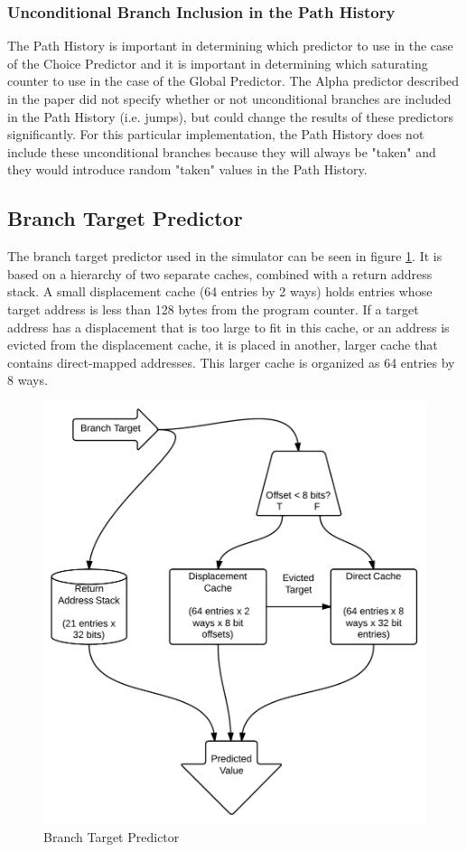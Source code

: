 \documentclass[twocolumn]{article}
\newcommand{\centerimage}[3]{
\begin{figure}[ht!]  
\begin{center}
#1
\caption{#2}
\label{#3}
\end{center}
\end{figure}}
\begin{document}
\subsubsection{Unconditional Branch Inclusion in the Path History}
The Path History is important in determining which predictor to use
in the case of the Choice Predictor and it is important in determining
which saturating counter to use in the case of the Global Predictor.
The Alpha predictor described in the paper did not specify whether or not
unconditional branches are included in the Path History (i.e. jumps), but
could change the results of these predictors significantly. For this 
particular implementation, the Path History does not include these
unconditional branches because they will always be "taken" and they
would introduce random "taken" values in the Path History. 

\subsection{Branch Target Predictor} 

The branch target predictor used in the simulator can be seen in
figure \ref{btbshape}. It is based on a hierarchy of two separate
caches, combined with a return address stack. A small displacement
cache (64 entries by 2 ways) holds entries whose target address is
less than 128 bytes from the program counter. If a target address has
a displacement that is too large to fit in this cache, or an address
is evicted from the displacement cache, it is placed in another,
larger cache that contains direct-mapped addresses. This larger cache
is organized as 64 entries by 8 ways.

\centerimage{\includegraphics[width=\columnwidth]{BTB.png}}{Branch
  Target Predictor}{btbshape}
\end{document}
